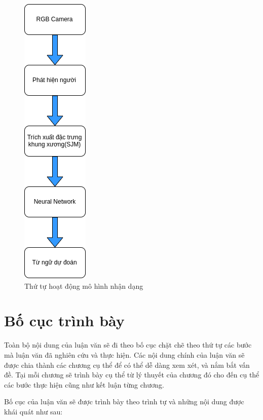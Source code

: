 \FloatBarrier
\begin{figure}[htp]
\begin{center}
\includegraphics[scale=0.7]{chap1/c1_figs/diagram.png}
\end{center}
\caption{Thứ tự hoạt động mô hình nhận dạng}
\label{fig:diagram}
\end{figure}
\FloatBarrier


\section{Bố cục trình bày}
\label{ss:bo_cuc_trinh_bay}

Toàn bộ nội dung của luận văn sẽ đi theo bố cục chặt chẽ theo thứ tự các bước mà luận văn đã nghiên cứu và thực hiện. Các nội dung chính của luận văn sẽ được chia thành các chương cụ thể để có thể dễ dàng xem xét, và nắm bắt vấn đề. Tại mỗi chương sẽ trình bày cụ thể từ lý thuyết của chương đó cho đến cụ thể các bước thực hiện cũng như kết luận từng chương.

Bố cục của luận văn sẽ được trình bày theo trình tự và những nội dung được khái quát như sau:


